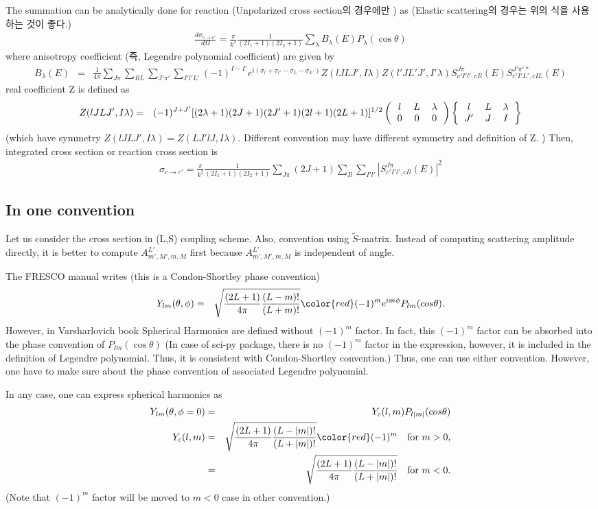 \documentclass[11pt]{book}
\newcommand{\bea}{\begin{eqnarray}}
\newcommand{\eea}{\end{eqnarray}}
\newcommand{\no}{\nonumber \\}
\newcommand{\threejsymbol}[6]{\left(\begin{tabular}{ccc} {$#1$}&{$#2$}&{$#3$}\\
                             {$#4$}&{$#5$}&{$#6$}\end{tabular}\right)}
\newcommand{\sixjsymbol}[6]{\left\{\begin{tabular}{ccc} {$#1$}&{$#2$}&{$#3$}\\
                             {$#4$}&{$#5$}&{$#6$} \end{tabular}\right\}}
\begin{document}
The summation can be analytically done for reaction (Unpolarized cross section의 경우에만 ) as
(Elastic scattering의 경우는 위의 식을 사용하는 것이 좋다.)
\bea 
\frac{d\sigma_{c\to c'}}{d\Omega}=\frac{\pi}{k^2}
 \frac{1}{(2I_1+1)(2I_2+1)}\sum_{\lambda} B_\lambda(E) P_\lambda(\cos\theta)
\eea 
where anisotropy coefficient (즉, Legendre polynomial coefficient) are given by 
\bea 
B_\lambda(E)&=&\frac{1}{4\pi}\sum_{J\pi}\sum_{Il L}\sum_{J'\pi'}\sum_{I' l' L'}
     (-1)^{I-I'} e^{i(\sigma_{l}+\sigma_{l'}-\sigma_L-\sigma_{L'})}
     Z(lJLJ',I\lambda) Z(l'JL'J',I'\lambda)
     S^{J\pi}_{c' I' l',cI l}(E)S^{J'\pi' *}_{c' I' L',cI L}(E)
\eea 
real coefficient Z is defined as
\bea 
Z(lJLJ',I\lambda)&=& (-1)^{J+J'}[(2\lambda+1)(2J+1)(2J'+1)(2l+1)(2L+1)]^{1/2}
 \threejsymbol{l}{L}{\lambda}{0}{0}{0}\sixjsymbol{l}{L}{\lambda}{J'}{J}{I}
\eea 
(which have symmetry  $Z(lJ LJ',I\lambda)=Z(L J' l J,I\lambda)$. Different convention may have
different symmetry and definition of Z. )
Then, integrated cross section or reaction cross section is
\bea 
\sigma_{c\to c'}=\frac{\pi}{k^2}\frac{1}{(2I_1+1)(2I_2+1)}\sum_{J\pi} 
                  (2J+1)\sum_{Il}\sum_{I'l'}| S^{J\pi}_{c' I' l',c I l}(E)|^2 
\eea 

\subsection{In one convention} 
Let us consider the cross section in (L,S) coupling scheme.
Also, convention using $\tilde{S}$-matrix. 
Instead of computing scattering amplitude directly, it is better to compute 
$A^{L'}_{m',M',m,M}$ first because $A^{L'}_{m',M',m,M}$ is independent of angle. 

The FRESCO manual writes  (this is a Condon-Shortley phase convention)
\bea 
Y_{lm}(\theta,\phi)&=& \sqrt{\frac{(2L+1)}{4\pi}\frac{(L-m)!}{(L+m)!}}{\color{red}(-1)^m} e^{im\phi} P_{lm}(cos\theta).
\eea 
However, in Varsharlovich book  Spherical Harmonics are defined without $(-1)^m$ factor. 
In fact, this $(-1)^m$ factor can be absorbed into the phase convention of $P_{lm}(\cos\theta)$
(In case of sci-py package, there is no $(-1)^m$ factor in the expression, however, 
it is included in the definition of Legendre polynomial. Thus, it is consistent with Condon-Shortley convention.)
Thus, one can use either convention. However, one have to make sure about the phase convention 
of associated Legendre polynomial. 

In any case, one can express spherical harmonics as
\bea 
Y_{lm}(\theta,\phi=0)&=& Y_c(l,m) P_{l|m|}(cos\theta)\no 
 Y_c(l,m)&=&\sqrt{\frac{(2L+1)}{4\pi}\frac{(L-|m|)!}{(L+|m|)!}}{\color{red}(-1)^m} \quad \mbox{for } m> 0,\no 
         &=&\sqrt{\frac{(2L+1)}{4\pi}\frac{(L-|m|)!}{(L+|m|)!}} \quad \mbox{for } m<0.
\eea  
(Note that $(-1)^m$ factor will be moved to $m<0$ case in other convention.)
\end{document}
